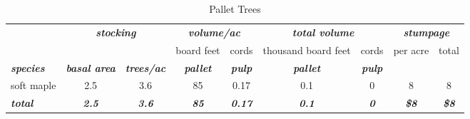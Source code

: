 \documentclass[landscape]{article}
\begin{document}
\begin{table}[H]

\caption{\label{tab:unnamed-chunk-27}Pallet Trees}
\fontsize{10}{12}\selectfont
\begin{tabular}[t]{lcccccccc}
\toprule
\multicolumn{1}{c}{\em{\textbf{ }}} & \multicolumn{2}{c}{\em{\textbf{stocking}}} & \multicolumn{2}{c}{\em{\textbf{volume/ac }}} & \multicolumn{2}{c}{\em{\textbf{total volume}}} & \multicolumn{2}{c}{\em{\textbf{stumpage}}} \\
\cmidrule(l{3pt}r{3pt}){2-3} \cmidrule(l{3pt}r{3pt}){4-5} \cmidrule(l{3pt}r{3pt}){6-7} \cmidrule(l{3pt}r{3pt}){8-9}
\multicolumn{3}{c}{ } & \multicolumn{1}{c}{board feet} & \multicolumn{1}{c}{cords} & \multicolumn{1}{c}{thousand board feet} & \multicolumn{1}{c}{cords} & \multicolumn{1}{c}{per acre} & \multicolumn{1}{c}{total} \\
\cmidrule(l{3pt}r{3pt}){4-4} \cmidrule(l{3pt}r{3pt}){5-5} \cmidrule(l{3pt}r{3pt}){6-6} \cmidrule(l{3pt}r{3pt}){7-7} \cmidrule(l{3pt}r{3pt}){8-8} \cmidrule(l{3pt}r{3pt}){9-9}
\rowcolor[HTML]{DCDCDC}  \em{\textbf{species}} & \em{\textbf{basal area}} & \em{\textbf{trees/ac}} & \em{\textbf{pallet}} & \em{\textbf{pulp}} & \em{\textbf{pallet}} & \em{\textbf{pulp}} & \em{\textbf{ }} & \em{\textbf{ }}\\
\midrule
\rowcolor{gray!6}  soft maple & 2.5 & 3.6 & 85 & 0.17 & 0.1 & 0 & 8 & 8\\
 
\rowcolor[HTML]{DCDCDC}  \em{\textbf{total}} & \em{\textbf{2.5}} & \em{\textbf{3.6}} & \em{\textbf{85}} & \em{\textbf{0.17}} & \em{\textbf{0.1}} & \em{\textbf{0}} & \em{\textbf{\$8}} & \em{\textbf{\$8}}\\
\bottomrule
\end{tabular}
\end{table}
\end{document}
